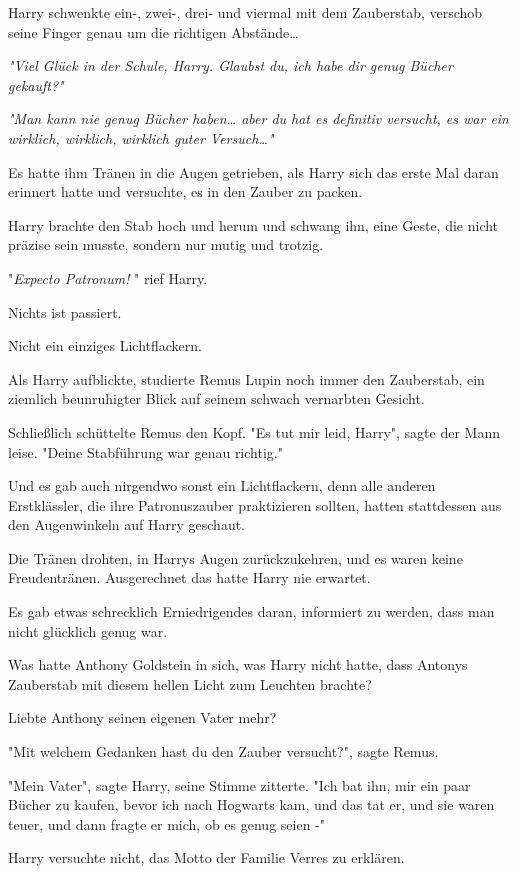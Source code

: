 {Harry schwenkte ein-, zwei-, drei- und viermal mit dem Zauberstab, verschob seine Finger genau um die richtigen Abstände…

\emph{\emph{"Viel Glück in der Schule, Harry. Glaubst du, ich habe dir genug Bücher gekauft?"}}

\emph{\emph{"Man kann nie genug Bücher haben… aber du hat es} \emph{definitiv} \emph{versucht, es war ein wirklich, wirklich, wirklich guter Versuch…"}}

Es hatte ihm Tränen in die Augen getrieben, als Harry sich das erste Mal daran erinnert hatte und versuchte, es in den Zauber zu packen.

Harry brachte den Stab hoch und herum und schwang ihn, eine Geste, die nicht präzise sein musste, sondern nur mutig und trotzig.

"\emph{Expecto Patronum!} " rief Harry.

Nichts ist passiert.

Nicht ein einziges Lichtflackern.

Als Harry aufblickte, studierte Remus Lupin noch immer den Zauberstab, ein ziemlich beunruhigter Blick auf seinem schwach vernarbten Gesicht.

Schließlich schüttelte Remus den Kopf. "Es tut mir leid, Harry", sagte der Mann leise. "Deine Stabführung war genau richtig."

Und es gab auch nirgendwo sonst ein Lichtflackern, denn alle anderen Erstklässler, die ihre Patronuszauber praktizieren sollten, hatten stattdessen aus den Augenwinkeln auf Harry geschaut.

Die Tränen drohten, in Harrys Augen zurückzukehren, und es waren keine Freudentränen. Ausgerechnet das hatte Harry nie erwartet.

Es gab etwas schrecklich Erniedrigendes daran, informiert zu werden, dass man nicht glücklich genug war.

Was hatte Anthony Goldstein in sich, was Harry nicht hatte, dass Antonys Zauberstab mit diesem hellen Licht zum Leuchten brachte?

Liebte Anthony seinen eigenen Vater mehr?

"Mit welchem Gedanken hast du den Zauber versucht?", sagte Remus.

"Mein Vater", sagte Harry, seine Stimme zitterte. "Ich bat ihn, mir ein paar Bücher zu kaufen, bevor ich nach Hogwarts kam, und das tat er, und sie waren teuer, und dann fragte er mich, ob es genug seien -"

Harry versuchte nicht, das Motto der Familie Verres zu erklären.

}
